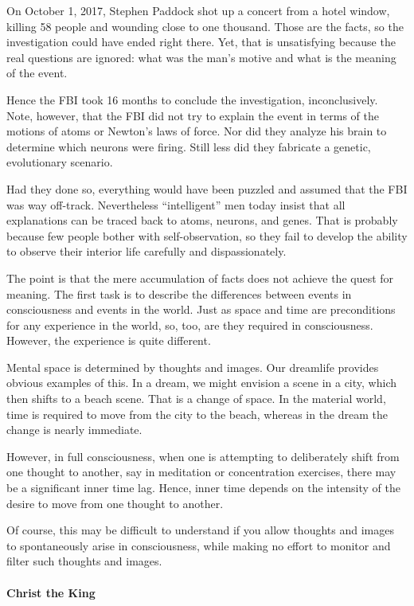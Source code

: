On October 1, 2017, Stephen Paddock shot up a concert from a hotel window, killing 58 people and wounding close to one thousand. Those are the facts, so the investigation could have ended right there. Yet, that is unsatisfying because the real questions are ignored: what was the man's motive and what is the meaning of the event.

Hence the FBI took 16 months to conclude the investigation, inconclusively. Note, however, that the FBI did not try to explain the event in terms of the motions of atoms or Newton's laws of force. Nor did they analyze his brain to determine which neurons were firing. Still less did they fabricate a genetic, evolutionary scenario.

Had they done so, everything would have been puzzled and assumed that the FBI was way off-track. Nevertheless ``intelligent'' men today insist that all explanations can be traced back to atoms, neurons, and genes. That is probably because few people bother with self-observation, so they fail to develop the ability to observe their interior life carefully and dispassionately.

The point is that the mere accumulation of facts does not achieve the quest for meaning. The first task is to describe the differences between events in consciousness and events in the world. Just as space and time are preconditions for any experience in the world, so, too, are they required in consciousness. However, the experience is quite different.

Mental space is determined by thoughts and images. Our dreamlife provides obvious examples of this. In a dream, we might envision a scene in a city, which then shifts to a beach scene. That is a change of space. In the material world, time is required to move from the city to the beach, whereas in the dream the change is nearly immediate.

However, in full consciousness, when one is attempting to deliberately shift from one thought to another, say in meditation or concentration exercises, there may be a significant inner time lag. Hence, inner time depends on the intensity of the desire to move from one thought to another.

Of course, this may be difficult to understand if you allow thoughts and images to spontaneously arise in consciousness, while making no effort to monitor and filter such thoughts and images.

\paragraph{Christ the King}


